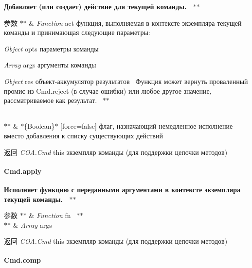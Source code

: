 {\bfseries {\bfseries {\bfseries  Добавляет (или создает) действие для текущей команды.~\newline
 $\ast$$\ast$
\begin{DoxyParams}{参数}
{\em $\ast$$\ast$} & {\itshape Function} {\ttfamily act} функция, выполняемая в контексте экземпляра текущей команды и принимающая следующие параметры\+:~\newline

\begin{DoxyItemize}
\item {\itshape Object} {\ttfamily opts} параметры команды~\newline

\item {\itshape Array} {\ttfamily args} аргументы команды~\newline

\item {\itshape Object} {\ttfamily res} объект-\/аккумулятор результатов~\newline
 Функция может вернуть проваленный промис из Cmd.\+reject (в случае ошибки) или любое другое значение, рассматриваемое как результат.~\newline
 $\ast$$\ast$
\end{DoxyItemize}\\
\hline
{\em $\ast$$\ast$} & $\ast$\{Boolean\}$\ast$ \mbox{[}force=false\mbox{]} флаг, назначающий немедленное исполнение вместо добавления к списку существующих действий~\newline
 {\bfseries }\\
\hline
\end{DoxyParams}
\begin{DoxyReturn}{返回}
{\bfseries } {\itshape C\+O\+A.\+Cmd} {\ttfamily this} экземпляр команды (для поддержки цепочки методов)
\end{DoxyReturn}
\paragraph*{Cmd.\+apply}}}}

{\bfseries {\bfseries {\bfseries  Исполняет функцию с переданными аргументами в контексте экземпляра текущей команды.~\newline
 $\ast$$\ast$
\begin{DoxyParams}{参数}
{\em $\ast$$\ast$} & {\itshape Function} {\ttfamily fn}~\newline
 $\ast$$\ast$\\
\hline
{\em $\ast$$\ast$} & {\itshape Array} {\ttfamily args}~\newline
 {\bfseries }\\
\hline
\end{DoxyParams}
\begin{DoxyReturn}{返回}
{\bfseries } {\itshape C\+O\+A.\+Cmd} {\ttfamily this} экземпляр команды (для поддержки цепочки методов)
\end{DoxyReturn}
\paragraph*{Cmd.\+comp}}}}

